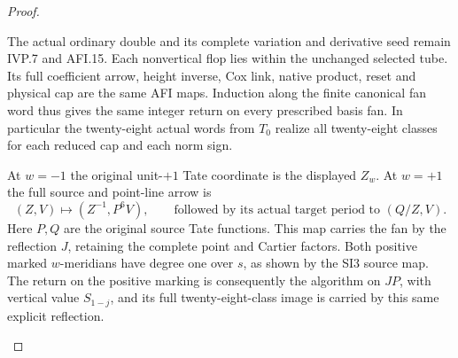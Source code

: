 \begin{proof}
\begin{enumerate}[label=\arabic*.]
The actual ordinary double and its complete variation and
derivative seed remain IVP.7 and AFI.15. Each nonvertical
flop lies within the unchanged selected tube. Its full
coefficient arrow, height inverse, Cox link, native product,
reset and physical cap are the same AFI maps. Induction
along the finite canonical fan word thus gives the same
integer return on every prescribed basis fan. In particular
the twenty-eight actual words from \(T_0\) realize all
twenty-eight classes for each reduced cap and each norm sign.

At \(w=-1\) the original unit-\(+1\) Tate coordinate is
the displayed \(Z_w\). At \(w=+1\) the full source and
point-line arrow is
\[
 (Z,V)\longmapsto(Z^{-1},P^6V),
 \qquad\text{followed by its actual target period to }(Q/Z,V).
 \tag{ICAP.19}
\]
Here \(P,Q\) are the original source Tate functions. This
map carries the fan by the reflection \(J\), retaining
the complete point and Cartier factors. Both positive
marked \(w\)-meridians have degree one over \(s\), as
shown by the SI3 source map. The return on the positive
marking is consequently the algorithm on \(JP\), with
vertical value \(S_{1-j}\), and its full twenty-eight-class
image is carried by this same explicit reflection.
\end{enumerate}
\end{proof}

